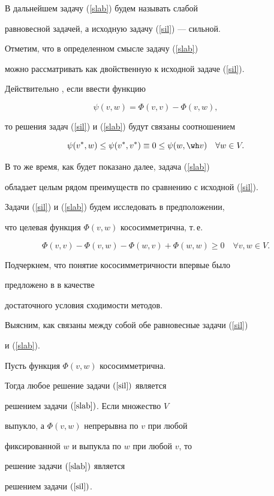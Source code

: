 В дальнейшем задачу (\ref{slab}) будем называть слабой 


равновесной задачей, а исходную задачу (\ref{sil}) --- сильной.


Отметим, что в определенном смысле задачу (\ref{slab})


можно рассматривать как двойственную к исходной задаче (\ref{sil}).


Действительно \cite{antsil}, если ввести функцию


$$


\psi(v,w) = \Phi(v,v) -\Phi(v,w),


$$


то решения задач (\ref{sil}) и  (\ref{slab}) будут связаны соотношением


$$


\psi(v^*,w) \leq \psi(v^*,v^*)\equiv 0 \leq \psi(w,\wh v) \quad\forall w\in V.


$$





В то же время, как будет показано далее, задача (\ref{slab})


обладает целым рядом преимуществ по сравнению с исходной (\ref{sil}).





Задачи (\ref{sil}) и (\ref{slab}) будем исследовать в предположении,


что целевая функция $\Phi(v,w)$ кососимметрична, т.\,е.


\begin{equation}\label{kos}


\Phi(v,v) - \Phi(v,w) - \Phi(w,v) + \Phi(w,w) \geq 0\quad \forall v, w\in V.


\end{equation}


Подчеркнем, что понятие кососимметричности  впервые было


предложено в \cite{antsil} в качестве


достаточного условия сходимости методов.





Выясним, как связаны между собой обе  равновесные задачи (\ref{sil})


и (\ref{slab}).





\begin{lem}\label{equ}


Пусть функция $\Phi(v,w)$ кососимметрична. 


Тогда любое решение задачи $(\ref{sil})$ является


решением задачи $(\ref{slab})$. Если множество $V$ 


выпукло, а $\Phi(v,w)$ непрерывна по $v$ при любой


фиксированной $w$ и выпукла по $w$ при любой $v$, то


решение задачи $(\ref{slab})$ является


решением задачи $(\ref{sil})$.


\end{lem}






